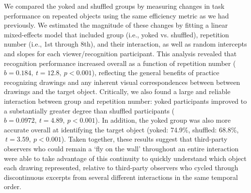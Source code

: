 \documentclass[10pt,letterpaper]{article}
\begin{document}
We compared the yoked and shuffled groups by measuring changes in task performance on repeated objects using the same efficiency metric as we had previously. 
We estimated the magnitude of these changes by fitting a linear mixed-effects model that included group (i.e., yoked vs. shuffled), repetition number (i.e., 1st through 8th), and their interaction, as well as random intercepts and slopes for each viewer/recognition participant. 
This analysis revealed that recognition performance increased overall as a function of repetition number ($b = 0.184, ~t = 12.8, ~p < 0.001$), reflecting the general benefits of practice recognizing drawings and any inherent visual correspondences between between drawings and the target object.  %
Critically, we also found a large and reliable interaction between group and repetition number: yoked participants improved to a substantially greater degree than shuffled participants ($b = 0.0972, ~t = 4.89, ~p<0.001$).
In addition, the yoked group was also more accurate overall at identifying the target object (yoked: 74.9\%, shuffled: 68.8\%, $~t = 3.59, ~p < 0.001$). %
Taken together, these results suggest that third-party observers who could remain a `fly on the wall' throughout an entire interaction were able to take advantage of this continuity to quickly understand which object each drawing represented, relative to third-party observers who cycled through discontinuous excerpts from several different interactions in the same temporal order. 




\end{document}
